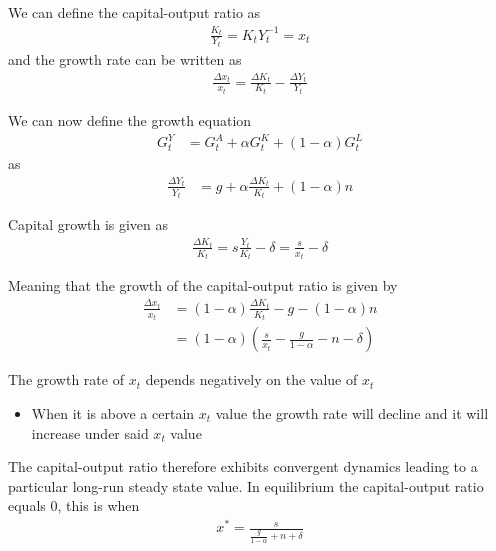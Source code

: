 \documentclass{beamer}
\begin{document}
\begin{frame}
  We can define the capital-output ratio as
\begin{align}
  \frac{K_t}{Y_t}=K_tY_t^{-1}=x_t
\end{align}
\medskip
and the growth rate can be written as
\begin{align}
  \frac{\Delta x_t}{x_t} = \frac{\Delta K_t}{K_t} - \frac{\Delta Y_t}{Y_t}
\end{align}
\end{frame}

\begin{frame}
  We can now define the growth equation 
\begin{align}
  G^Y_t &= G^A_t + \alpha G^K_t + (1-\alpha)G^L_t  
\end{align}
as
\begin{align}
  \frac{\Delta Y_t}{Y_t} &= g + \alpha \frac{\Delta K_t}{K_t} + (1-\alpha)n
\end{align}

Capital growth is given as
\begin{align}
  \frac{\Delta K_t}{K_t} = s \frac{Y_t}{K_t} - \delta = \frac{s}{x_t}-\delta
\end{align}

Meaning that the growth of the capital-output ratio is given by
\begin{align}
  \frac{\Delta x_t}{x_t} &= (1-\alpha) \frac{\Delta K_t}{K_t} -g - (1-\alpha)n\\ \nonumber
                         &= (1-\alpha) (\frac{s}{x_t} - \frac{g}{1-\alpha}-n-\delta)
\end{align}
\end{frame}

\begin{frame}
  The growth rate of $x_t$ depends negatively on the value of $x_t$
  \begin{itemize}
    \item When it is above a certain $x_t$ value the growth rate will decline and it will increase under said $x_t$ value
  \end{itemize}
  \medskip
  The capital-output ratio therefore exhibits convergent dynamics leading to a particular long-run steady state value. 
  In equilibrium the capital-output ratio equals 0, this is when
  \begin{align}
    x^* = \frac{s}{\frac{g}{1-\alpha}+n+\delta}
    \end{align}
\end{frame}
\end{document}
